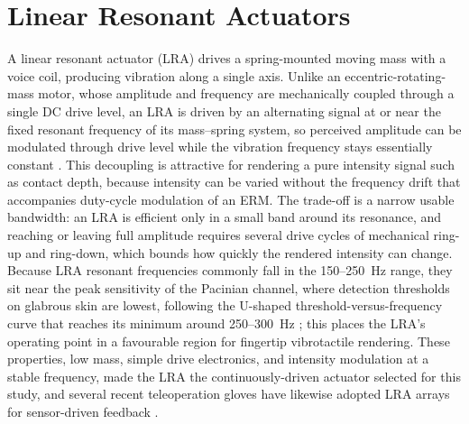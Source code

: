 \documentclass[12pt, a4paper]{report}
\begin{document}
\section{Linear Resonant Actuators}
A linear resonant actuator (LRA) drives a spring-mounted moving mass with a voice coil, producing vibration along a single axis. Unlike an eccentric-rotating-mass motor, whose amplitude and frequency are mechanically coupled through a single DC drive level, an LRA is driven by an alternating signal at or near the fixed resonant frequency of its mass--spring system, so perceived amplitude can be modulated through drive level while the vibration frequency stays essentially constant \cite{pacchierotti2017}. This decoupling is attractive for rendering a pure intensity signal such as contact depth, because intensity can be varied without the frequency drift that accompanies duty-cycle modulation of an ERM. The trade-off is a narrow usable bandwidth: an LRA is efficient only in a small band around its resonance, and reaching or leaving full amplitude requires several drive cycles of mechanical ring-up and ring-down, which bounds how quickly the rendered intensity can change. Because LRA resonant frequencies commonly fall in the 150--250~Hz range, they sit near the peak sensitivity of the Pacinian channel, where detection thresholds on glabrous skin are lowest, following the U-shaped threshold-versus-frequency curve that reaches its minimum around 250--300~Hz \cite{verrillo1985}; this places the LRA's operating point in a favourable region for fingertip vibrotactile rendering. These properties, low mass, simple drive electronics, and intensity modulation at a stable frequency, made the LRA the continuously-driven actuator selected for this study, and several recent teleoperation gloves have likewise adopted LRA arrays for sensor-driven feedback \cite{luo2024}.
\end{document}
